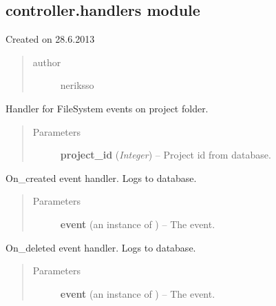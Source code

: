 \documentclass[letterpaper,10pt,english]{sphinxmanual}
\begin{document}
\subsection{controller.handlers module}
\label{controller:module-controller.handlers}\label{controller:controller-handlers-module}
Created on 28.6.2013
\begin{quote}\begin{description}
\item[{author}] \leavevmode
neriksso

\end{description}\end{quote}

\begin{fulllineitems}
\label{controller:controller.handlers.PROJECT_FILE_EVENT_HANDLER}
Handler for FileSystem events on project folder.
\begin{quote}\begin{description}
\item[{Parameters}] \leavevmode
\textbf{project\_id} (\emph{Integer}) -- Project id from database.

\end{description}\end{quote}

\begin{fulllineitems}
\label{controller:controller.handlers.PROJECT_FILE_EVENT_HANDLER.on_created}
On\_created event handler. Logs to database.
\begin{quote}\begin{description}
\item[{Parameters}] \leavevmode
\textbf{event} (an instance of ) -- The event.

\end{description}\end{quote}

\end{fulllineitems}


\begin{fulllineitems}
\label{controller:controller.handlers.PROJECT_FILE_EVENT_HANDLER.on_deleted}
On\_deleted event handler. Logs to database.
\begin{quote}\begin{description}
\item[{Parameters}] \leavevmode
\textbf{event} (an instance of ) -- The event.


\end{description}
\end{quote}
\end{fulllineitems}
\end{fulllineitems}
\end{document}
